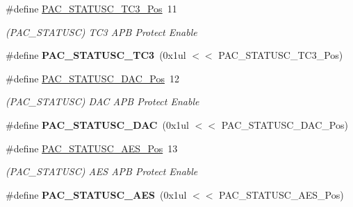 \begin{DoxyCompactItemize}
\item 
\hypertarget{group___s_a_m_l21___p_a_c_ga8f6e9ed2f485b02eb9ed9befc63ab900}{}\#define \hyperlink{group___s_a_m_l21___p_a_c_ga8f6e9ed2f485b02eb9ed9befc63ab900}{P\+A\+C\+\_\+\+S\+T\+A\+T\+U\+S\+C\+\_\+\+T\+C3\+\_\+\+Pos}~11\label{group___s_a_m_l21___p_a_c_ga8f6e9ed2f485b02eb9ed9befc63ab900}

\begin{DoxyCompactList}\small\item\em (P\+A\+C\+\_\+\+S\+T\+A\+T\+U\+S\+C) T\+C3 A\+P\+B Protect Enable \end{DoxyCompactList}\item 
\hypertarget{group___s_a_m_l21___p_a_c_ga0807808bf9013ca579e3d2af9a7240e1}{}\#define {\bfseries P\+A\+C\+\_\+\+S\+T\+A\+T\+U\+S\+C\+\_\+\+T\+C3}~(0x1ul $<$$<$ P\+A\+C\+\_\+\+S\+T\+A\+T\+U\+S\+C\+\_\+\+T\+C3\+\_\+\+Pos)\label{group___s_a_m_l21___p_a_c_ga0807808bf9013ca579e3d2af9a7240e1}

\item 
\hypertarget{group___s_a_m_l21___p_a_c_gaddc2e6f674afc36c9b6989bee1b04e91}{}\#define \hyperlink{group___s_a_m_l21___p_a_c_gaddc2e6f674afc36c9b6989bee1b04e91}{P\+A\+C\+\_\+\+S\+T\+A\+T\+U\+S\+C\+\_\+\+D\+A\+C\+\_\+\+Pos}~12\label{group___s_a_m_l21___p_a_c_gaddc2e6f674afc36c9b6989bee1b04e91}

\begin{DoxyCompactList}\small\item\em (P\+A\+C\+\_\+\+S\+T\+A\+T\+U\+S\+C) D\+A\+C A\+P\+B Protect Enable \end{DoxyCompactList}\item 
\hypertarget{group___s_a_m_l21___p_a_c_ga175f2f7ded178bad1cc57cbe64c65c1c}{}\#define {\bfseries P\+A\+C\+\_\+\+S\+T\+A\+T\+U\+S\+C\+\_\+\+D\+A\+C}~(0x1ul $<$$<$ P\+A\+C\+\_\+\+S\+T\+A\+T\+U\+S\+C\+\_\+\+D\+A\+C\+\_\+\+Pos)\label{group___s_a_m_l21___p_a_c_ga175f2f7ded178bad1cc57cbe64c65c1c}

\item 
\hypertarget{group___s_a_m_l21___p_a_c_ga943e14d4182bd430af9f0b021907f857}{}\#define \hyperlink{group___s_a_m_l21___p_a_c_ga943e14d4182bd430af9f0b021907f857}{P\+A\+C\+\_\+\+S\+T\+A\+T\+U\+S\+C\+\_\+\+A\+E\+S\+\_\+\+Pos}~13\label{group___s_a_m_l21___p_a_c_ga943e14d4182bd430af9f0b021907f857}

\begin{DoxyCompactList}\small\item\em (P\+A\+C\+\_\+\+S\+T\+A\+T\+U\+S\+C) A\+E\+S A\+P\+B Protect Enable \end{DoxyCompactList}\item 
\hypertarget{group___s_a_m_l21___p_a_c_gaba0f0e2fe0f83ee4f7e216100070ff89}{}\#define {\bfseries P\+A\+C\+\_\+\+S\+T\+A\+T\+U\+S\+C\+\_\+\+A\+E\+S}~(0x1ul $<$$<$ P\+A\+C\+\_\+\+S\+T\+A\+T\+U\+S\+C\+\_\+\+A\+E\+S\+\_\+\+Pos)\label{group___s_a_m_l21___p_a_c_gaba0f0e2fe0f83ee4f7e216100070ff89}


\end{DoxyCompactItemize}
